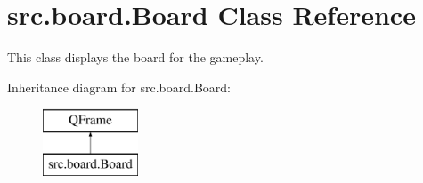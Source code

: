 \hypertarget{classsrc_1_1board_1_1_board}{}\section{src.\+board.\+Board Class Reference}
\label{classsrc_1_1board_1_1_board}


This class displays the board for the gameplay.  


Inheritance diagram for src.\+board.\+Board\+:\begin{figure}[H]
\begin{center}
\leavevmode
\includegraphics[height=2.000000cm]{classsrc_1_1board_1_1_board}
\end{center}
\end{figure}
